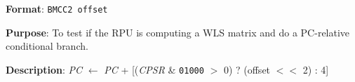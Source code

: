 \documentclass[11pt]{article}
\begin{document}
\textbf{Format}: \texttt{BMCC2 offset}

\textbf{Purpose}: To test if the RPU is computing a WLS matrix and do a PC-relative conditional branch.

\textbf{Description}: \emph{PC} $\leftarrow$ \emph{PC} + [(\emph{CPSR} \& \texttt{01000} $>$ 0) ? (offset $<<$ 2) : 4]
\end{document}

